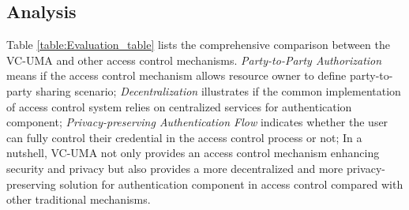 \documentclass[conference, dvipdfmx]{IEEEtran} %
\begin{document}
\begin{sloppypar}
\subsection{Analysis}

Table \ref{table:Evaluation_table} lists the comprehensive comparison between the VC-UMA and other access control mechanisms. \textit{Party-to-Party Authorization} means if the access control mechanism allows resource owner to define party-to-party sharing  scenario;
\textit{Decentralization} illustrates if the common implementation of access control system relies on centralized services for authentication component; \textit{Privacy-preserving Authentication Flow} indicates whether the user can fully control their credential in the access control process or not;
In a nutshell, VC-UMA not only provides an access control mechanism enhancing security and privacy but also provides a more decentralized and more privacy-preserving solution for authentication component in access control compared with other traditional mechanisms. 



\end{sloppypar}
\end{document}
